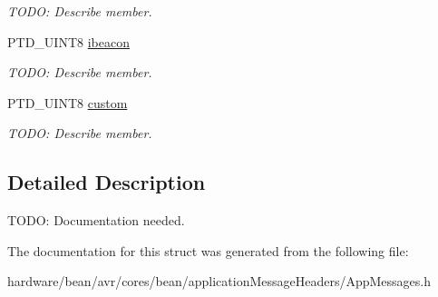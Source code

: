 \begin{DoxyCompactItemize}
\begin{DoxyCompactList}\small\item\em T\+O\+D\+O\+: Describe member. \end{DoxyCompactList}\item 
\hypertarget{struct_a_d_v___s_w_i_t_c_h___e_n_a_b_l_e_d___t_ae8406f0474ff406d1b90cb4e0c3ca37b}{}P\+T\+D\+\_\+\+U\+I\+N\+T8 \hyperlink{struct_a_d_v___s_w_i_t_c_h___e_n_a_b_l_e_d___t_ae8406f0474ff406d1b90cb4e0c3ca37b}{ibeacon}\label{struct_a_d_v___s_w_i_t_c_h___e_n_a_b_l_e_d___t_ae8406f0474ff406d1b90cb4e0c3ca37b}

\begin{DoxyCompactList}\small\item\em T\+O\+D\+O\+: Describe member. \end{DoxyCompactList}\item 
\hypertarget{struct_a_d_v___s_w_i_t_c_h___e_n_a_b_l_e_d___t_a96fb2aabe9c48dd9961dae8e712015ad}{}P\+T\+D\+\_\+\+U\+I\+N\+T8 \hyperlink{struct_a_d_v___s_w_i_t_c_h___e_n_a_b_l_e_d___t_a96fb2aabe9c48dd9961dae8e712015ad}{custom}\label{struct_a_d_v___s_w_i_t_c_h___e_n_a_b_l_e_d___t_a96fb2aabe9c48dd9961dae8e712015ad}

\begin{DoxyCompactList}\small\item\em T\+O\+D\+O\+: Describe member. \end{DoxyCompactList}\end{DoxyCompactItemize}


\subsection{Detailed Description}
T\+O\+D\+O\+: Documentation needed. 

The documentation for this struct was generated from the following file\+:\begin{DoxyCompactItemize}
\item 
hardware/bean/avr/cores/bean/application\+Message\+Headers/App\+Messages.\+h\end{DoxyCompactItemize}
